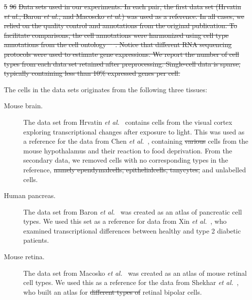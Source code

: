 \documentclass[runningheads]{llncs}
\newcommand{\etal}{\textit{et al.}}
\providecommand{\DIFadd}[1]{{\protect\color{blue}\uwave{#1}}} %
\providecommand{\DIFdel}[1]{{\protect\color{red}\sout{#1}}}                      %
\providecommand{\DIFaddbegin}{} %
\providecommand{\DIFaddend}{} %
\providecommand{\DIFdelbegin}{} %
\providecommand{\DIFdelend}{} %
\providecommand{\DIFdelFL}[1]{\DIFdel{#1}} %
\newcommand{\DIFscaledelfig}{0.5}
\newlength{\DIFdelgraphicswidth} %
\newlength{\DIFdelgraphicsheight} %
\newcommand{\DIFaddincludegraphics}[2][]{{\color{blue}\fbox{\DIFOincludegraphics[#1]{#2}}}} %
\newcommand{\DIFdelincludegraphics}[2][]{%
\sbox{\DIFdelgraphicsbox}{\DIFOincludegraphics[#1]{#2}}%
\settoboxwidth{\DIFdelgraphicswidth}{\DIFdelgraphicsbox} %
\settoboxtotalheight{\DIFdelgraphicsheight}{\DIFdelgraphicsbox} %
\scalebox{\DIFscaledelfig}{%
\parbox[b]{\DIFdelgraphicswidth}{\usebox{\DIFdelgraphicsbox}\\[-\baselineskip] \rule{\DIFdelgraphicswidth}{0em}}\llap{\resizebox{\DIFdelgraphicswidth}{\DIFdelgraphicsheight}{%
\setlength{\unitlength}{\DIFdelgraphicswidth}%
\begin{picture}(1,1)%
\thicklines\linethickness{2pt} %
{\color[rgb]{1,0,0}\put(0,0){\framebox(1,1){}}}%
{\color[rgb]{1,0,0}\put(0,0){\line( 1,1){1}}}%
{\color[rgb]{1,0,0}\put(0,1){\line(1,-1){1}}}%
\end{picture}%
}\hspace*{3pt}}} %
} %
\DeclareRobustCommand{\DIFaddbegin}{\DIFOaddbegin \let\includegraphics\DIFaddincludegraphics} %
\DeclareRobustCommand{\DIFaddend}{\DIFOaddend \let\includegraphics\DIFOincludegraphics} %
\DeclareRobustCommand{\DIFdelbegin}{\DIFOdelbegin \let\includegraphics\DIFdelincludegraphics} %
\DeclareRobustCommand{\DIFdelend}{\DIFOaddend \let\includegraphics\DIFOincludegraphics} %
\begin{document}
\DIFdelFL{5 }%
\DIFdelFL{96 }%
{%
\DIFdelFL{Data sets used in our experiments. In each pair, the first data set
(Hrvatin \etal, Baron \etal, and Macoscko \etal) was used as a reference. In
all cases, we relied on the quality control and annotations from the original
publication. To facilitate comparisons, the cell annotations were harmonized using
cell type annotations from the cell ontology~\mbox{%
\cite{cell_ontology}}%
. Notice that
different RNA sequencing protocols were used to estimate gene expressions. We
report the number of cell types from each data set retained after
preprocessing. Single-cell data is sparse, typically containing less than 10\%
expressed genes per cell.}}

\DIFdelend \DIFaddbegin \DIFadd{\ref{tab:data sets}).
}\DIFaddend The cells in the data sets originates from the following three tissues:
\DIFaddbegin 

\DIFaddend \begin{description}
\item[Mouse brain.] The data set from Hrvatin \etal~\cite{hrvatin2018} contains
cells from the visual cortex exploring transcriptional changes after exposure
to light. This was used as a reference for the data from Chen
\etal~\cite{chen2017}, containing \DIFdelbegin \DIFdel{various }\DIFdelend cells from the mouse hypothalamus and
their reaction to food deprivation. From the secondary data, we removed cells
with no corresponding types in the reference\DIFaddbegin \DIFadd{: tanycytes, ependymal}\DIFaddend ,
\DIFdelbegin \DIFdel{namely ependymalcells,
epithelialcells, tanycytes, }\DIFdelend \DIFaddbegin \DIFadd{epithelial, }\DIFaddend and unlabelled cells.

\item[Human pancreas.] The data set from Baron \etal~\cite{baron2016} was
created as an atlas of pancreatic cell types. We used this set as a reference
for data from Xin \etal~\cite{xin2016}, who examined transcriptional
differences between healthy and type 2 diabetic patients.

\item[Mouse retina.] The data set from Macosko \etal~\cite{macosko2015} was
created as an atlas of mouse retinal cell types. We used this as a reference
for the data from Shekhar \etal~\cite{shekhar2016}, who built an atlas for \DIFdelbegin \DIFdel{different types of }\DIFdelend retinal bipolar cells.
\end{description}
\end{document}
